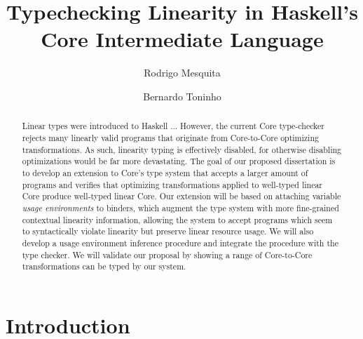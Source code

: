 \documentclass[sigplan,screen,review]{acmart}
\begin{document}
\title{Typechecking Linearity in Haskell's Core Intermediate Language}

\author{Rodrigo Mesquita}

\author{Bernardo Toninho}

\begin{abstract}
Linear types were introduced to Haskell ...
%
However, the current Core type-checker rejects many linearly valid programs
that originate from Core-to-Core optimizing transformations. As such, linearity
typing is effectively disabled, for otherwise disabling optimizations would be
far more devastating.
%
The goal of our proposed dissertation is to develop an extension to Core's type
system that accepts a larger amount of programs and verifies that optimizing
transformations applied to well-typed linear Core produce well-typed linear
Core.
%
Our extension will be based on attaching variable \emph{usage environments} to
binders, which augment the type system with more  fine-grained contextual
linearity information, allowing the system to accept programs which seem to
syntactically violate linearity but preserve linear resource usage. We will
also develop a usage environment inference procedure and integrate the
procedure with the type checker.  We will validate our proposal by showing a
range of Core-to-Core transformations can be typed by our system.
\end{abstract}

\maketitle

\section{Introduction}
\end{document}

